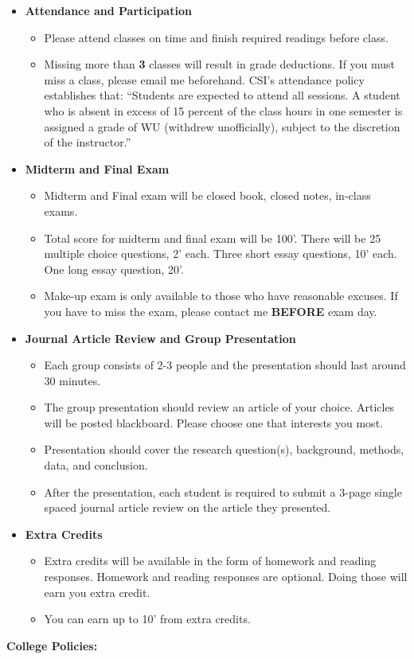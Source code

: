 \documentclass[11pt]{article}
\begin{document}
\begin{itemize}
	\item \textbf {Attendance and Participation}
		\begin{itemize}
			\item Please attend classes on time and finish required readings before class.
			\item Missing more than \textbf{3} classes will result in grade deductions. If you must miss a class, please email me beforehand.
			CSI’s attendance policy establishes that: “Students are expected to attend all sessions. A student who is absent in excess of 15 percent of the class hours in one semester is assigned a grade of WU (withdrew unofficially), subject to the discretion of the instructor.” 
		\end{itemize}
	\item \textbf {Midterm and Final Exam }
		\begin{itemize}
			\item Midterm and Final exam will be closed book, closed notes, in-class exams. 
			\item Total score for midterm and final exam will be 100'. There will be 25 multiple choice questions, 2' each. Three short essay questions, 10' each. One long essay question, 20'. 
			\item Make-up exam is only available to those who have reasonable excuses. If you have to miss the exam, please contact me \textbf{BEFORE} exam day.
		\end{itemize}
	\item \textbf {Journal Article Review and Group Presentation}
		\begin{itemize}
			\item Each group consists of 2-3 people and the presentation should last around 30 minutes.   
			\item The group presentation should review an article of your choice. Articles will be posted blackboard. Please choose one that interests you most.
			\item Presentation should cover the research question(s), background, methods, data, and conclusion. 
			\item After the presentation, each student is required to submit a 3-page single spaced journal article review on the article they presented.
		\end{itemize}
	\item \textbf{Extra Credits}
		\begin{itemize}
			\item Extra credits will be available in the form of homework and reading responses. Homework and reading responses are optional. Doing those will earn you extra credit.
			\item You can earn up to 10' from extra credits. 
		\end{itemize}
\end{itemize}
\newpage
\textbf {\large College Policies:} 
\end{document}
